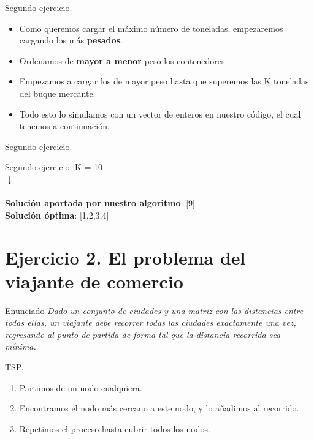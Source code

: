 \documentclass[10pt, xcolor=table]{beamer}
\begin{document}
\begin{frame}[fragile]{Segundo ejercicio. }
	\begin{itemize}
		\item Como queremos cargar el máximo número de toneladas, empezaremos cargando los más \textbf{pesados}.
		\item Ordenamos de \textbf{mayor a menor} peso los contenedores.
		\item Empezamos a cargar los de mayor peso hasta que superemos las K toneladas del buque mercante.
		\item Todo esto lo simulamos con un vector de enteros en nuestro código, el cual tenemos a continuación.
	\end{itemize}
\end{frame}

\begin{frame}[fragile]{Segundo ejercicio. }
	
\end{frame}

\begin{frame}[fragile]{Segundo ejercicio. }
	\centering [5, 4, 6, 1, 1, 2, 7, 9, 8, 3] \hspace{0.2cm}K = 10
	\\
	\centering $\downarrow$
	\\
	\centering [9, 8, 7, 6, 5, 4, 3, 2, 1, 1]
	\\
	\textbf{Solución aportada por nuestro algoritmo}: [9]
	\\
	\textbf{Solución óptima}: [1,2,3,4]
	
\end{frame}

\section{Ejercicio 2. El problema del viajante de comercio}

\begin{frame}[fragile]{Enunciado}
\textit{Dado un conjunto de ciudades y una matriz con las distancias entre todas ellas, un viajante debe recorrer todas las ciudades exactamente una vez, regresando al punto de partida de forma tal que la distancia recorrida sea mínima.}
\end{frame}

\begin{frame}[fragile]{TSP. }
\begin{enumerate}
	\item Partimos de un nodo cualquiera.
	\item Encontramos el nodo más cercano a este nodo, y lo añadimos al recorrido.
	\item Repetimos el proceso hasta cubrir todos los nodos.
\end{enumerate}
\end{frame}
\end{document}
